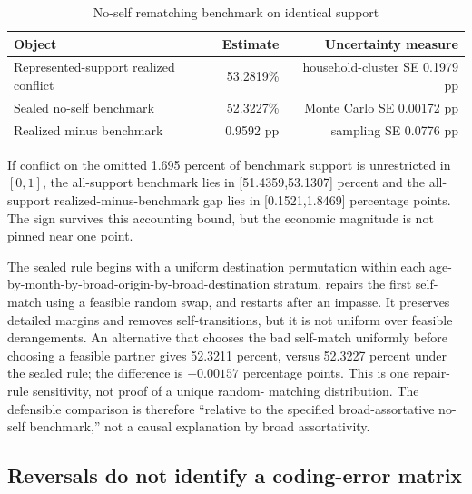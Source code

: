\begin{table}[htbp]
\centering
\caption{No-self rematching benchmark on identical support}\label{tab:apphard}
\small
\begin{tabularx}{\textwidth}{Yrr}
\toprule
Object & Estimate & Uncertainty measure \\
\midrule
Represented-support realized conflict & 53.2819\% & household-cluster SE 0.1979 pp \\
Sealed no-self benchmark & 52.3227\% & Monte Carlo SE 0.00172 pp \\
Realized minus benchmark & 0.9592 pp & sampling SE 0.0776 pp \\
\bottomrule
\end{tabularx}
\end{table}

If conflict on the omitted 1.695 percent of benchmark support is unrestricted
in $[0,1]$, the all-support benchmark lies in [51.4359,53.1307] percent and the
all-support realized-minus-benchmark gap lies in [0.1521,1.8469] percentage
points.  The sign survives this accounting bound, but the economic magnitude is
not pinned near one point.

The sealed rule begins with a uniform destination permutation within each
age-by-month-by-broad-origin-by-broad-destination stratum, repairs the first
self-match using a feasible random swap, and restarts after an impasse.  It
preserves detailed margins and removes self-transitions, but it is not uniform
over feasible derangements.  An alternative that chooses the bad self-match
uniformly before choosing a feasible partner gives 52.3211 percent, versus
52.3227 percent under the sealed rule; the difference is $-0.00157$ percentage
points.  This is one repair-rule sensitivity, not proof of a unique random-
matching distribution.  The defensible comparison is therefore ``relative to
the specified broad-assortative no-self benchmark,'' not a causal explanation
by broad assortativity.

\subsection{Reversals do not identify a coding-error matrix}

